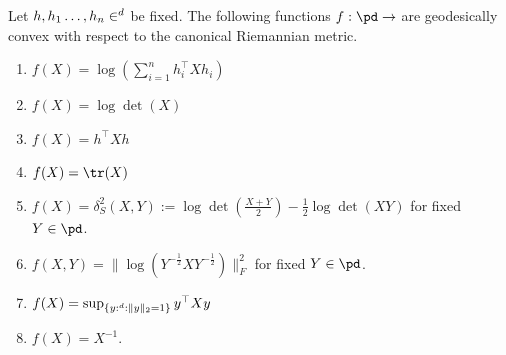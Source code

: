 \documentclass[twoside,11pt]{article}
\begin{document}
\begin{prop}
Let $h, h_1 \ldots, h_n \in \real^d$ be fixed. The following functions $f:\pd \to \real$ are geodesically convex with respect to the canonical Riemannian metric. 
    \begin{enumerate}[label=(\theenumi)]
        \item $f(X) = \log \left(\sum_{i=1}^n h_i^\top X h_i\right)$
        \item $f(X) = \log \det(X)$
        \item $f(X) = h^\top X h$
        \item $f(X) = \tr (X)$
        \item $f(X) = \delta_S^2(X,Y):= \log \det \left(\frac{X+Y}{2}\right) - \frac{1}{2}\log\det(XY)$ for fixed $Y \in \pd$.
        \item $f(X,Y) = \|\log \left(Y^{-\frac{1}{2}}X Y^{-\frac{1}{2}} \right) \|_F^2$ for fixed $Y \in \pd$.
        \item $f(X) = \sup_{\{y:\real^d : \|y\|_2=1\}}y^\top X y$
        \item $f(X) = X^{-1}$.
    \end{enumerate}
\end{prop}
\end{document}
